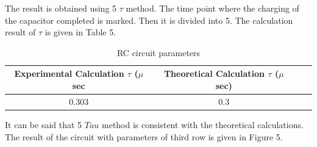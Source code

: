 \documentclass[letterpaper,12pt]{article}
\begin{document}
The result is obtained using 5 \(\tau\) method. The time point where the charging of the capacitor completed is marked. Then it is divided into 5. The calculation result of \(\tau\) is given in Table 5.
\begin{table}[H]
	\begin{center}
	\caption{RC circuit parameters}
	\vspace{2mm}
		\begin{tabular}{||c | c | c | c||} 
		 \hline
		 Experimental Calculation \(\tau\) (\(\mu\) sec & Theoretical Calculation \(\tau\) (\(\mu\) sec) \\ [0.5ex] 
		 \hline\hline
		 0.303 & 0.3 \\ 
		 \hline
	\end{tabular}
	\end{center}
	\end{table}
It can be said that 5 \(Tau\) method is consistent with the theoretical calculations. \\
The result of the circuit with parameters of third row is given in Figure 5.
\end{document}
